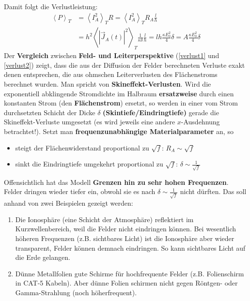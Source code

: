 			   Damit folgt die Verlustleistung:
			        \begin{equation}\label{verlust2}\begin{split}
					        \left\langle P\right\rangle_T &= \left\langle I_A^2 \right\rangle_T R = \left\langle I_A^2 \right\rangle_T R_A \frac{l}{h} \\
					        &= h^2 \left\langle \left| \vec{J}_A(t) \right|^2  \right\rangle_T \frac{1}{\kappa\delta} \frac{l}{h} = l h \frac{\kappa E_0^2}{4} \delta = A \frac{\kappa E_0^2}{4} \delta
				        \end{split}\end{equation}
	Der \textbf{Vergleich} zwischen \textbf{Feld- und Leiterperspektive} (\ref{verlust1} und \ref{verlust2}) zeigt, dass die aus der Diffusion der Felder berechneten Verluste exakt denen entsprechen, die aus ohmschen Leiterverlusten des Flächenstroms berechnet wurden. Man spricht von \textbf{Skineffekt-Verlusten}. Wird die exponentiell abklingende Stromdichte im Halbraum
			        \textbf{ersatzweise} durch einen konstanten Strom (den \textbf{Flächenstrom}) ersetzt, so werden in einer
			        vom Strom durchsetzten Schicht der Dicke $\delta$ \textbf{(Skintiefe/Eindringtiefe)} gerade die Skineffekt-Verluste umgesetzt (es wird jeweils eine andere $x$-Ausdehnung betrachtet!). 
			  Setzt man \textbf{frequenzunabhängige Materialparameter} an, so
			        \begin{itemize}
				        \item steigt der Flächenwiderstand proportional zu $\sqrt{f}$: $R_A \sim \sqrt{f}$
				        \item sinkt die Eindringtiefe umgekehrt proportional zu $\sqrt{f}$: $\delta \sim \frac{1}{\sqrt{f}}$
			        \end{itemize}
			   Offensichtlich hat das Modell \textbf{Grenzen hin zu sehr hohen Frequenzen}. Felder dringen wieder tiefer ein, obwohl sie es nach $\delta \sim \frac{1}{\sqrt{f}}$ nicht dürften. Das soll anhand von zwei Beispielen gezeigt werden:
			   \begin{enumerate}
			    \item Die Ionosphäre (eine Schicht der Atmosphäre) reflektiert im Kurzwellenbereich, weil die Felder nicht eindringen können. Bei wesentlich höheren Frequenzen (z.B. sichtbares Licht) ist die Ionosphäre aber wieder transparent, Felder können demnach eindringen. So kann sichtbares Licht auf die Erde gelangen.
			    \item Dünne Metallfolien gute Schirme für hochfrequente Felder (z.B. Folienschirm in CAT-5 Kabeln). Aber dünne Folien schirmen nicht gegen Röntgen- oder Gamma-Strahlung (noch höherfrequent).
			    \end{enumerate}
